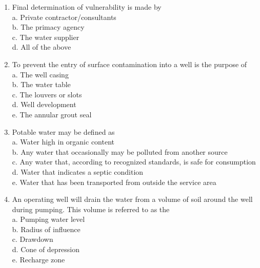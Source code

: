 \documentclass{article}
\begin{document}
\begin{enumerate}
  \item Final determination of vulnerability is made by\\
a. Private contractor/consultants\\
b. The primacy agency\\
c. The water supplier\\
d. All of the above\\

  \item To prevent the entry of surface contamination into a well is the purpose of\\

a. The well casing\\

b. The water table\\

c. The louvers or slots\\

d. Well development\\

e. The annular grout seal\\

\item Potable water may be defined as\\

a. Water high in organic content\\

b. Any water that occasionally may be polluted from another source\\

c. Any water that, according to recognized standards, is safe for consumption\\

d. Water that indicates a septic condition\\

e. Water that has been transported from outside the service area\\

\item An operating well will drain the water from a volume of soil around the well during pumping. This volume is referred to as the\\
a.	Pumping water level\\
b.	Radius of influence\\
c.	Drawdown\\
d. Cone of depression\\
e.	Recharge zone\\


\end{enumerate}
\end{document}
